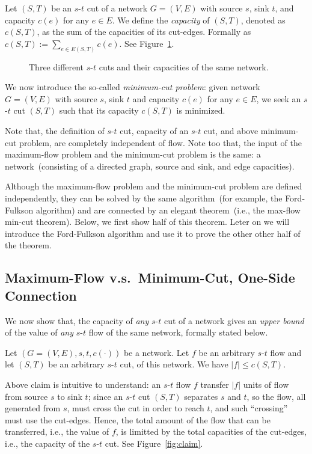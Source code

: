 Let $(S, T)$ be an $s$-$t$ cut of a network $G = (V, E)$ with source $s$, sink $t$, and capacity $c(e)$ for any $e\in E$.
We define the \emph{capacity} of $(S, T)$, denoted as $c(S, T)$, as the sum of the capacities of its cut-edges. Formally
as $c(S, T) := \sum_{e\in E(S, T)} c(e)$. See Figure~\ref{fig:cut}.

\begin{figure}[h]
\centering{}
\caption{Three different $s$-$t$ cuts and their capacities of the same network.}
\label{fig:cut}
\end{figure}

We now introduce the so-called \emph{minimum-cut problem}: given network $G = (V, E)$ with source $s$, sink $t$ and capacity $c(e)$ for any $e\in E$,
   we seek an $s$-$t$ cut $(S, T)$ such that its capacity $c(S, T)$ is minimized.

Note that, the definition of $s$-$t$ cut, capacity of an $s$-$t$ cut, and above minimum-cut problem,
are completely independent of flow. Note too that, the input of the maximum-flow problem and the minimum-cut
problem is the same: a network~(consisting of a directed graph, source and sink, and edge capacities).

Although the maximum-flow problem and the minimum-cut problem are defined independently, they
can be solved by the same algorithm~(for example, the Ford-Fulkson algorithm)
and are connected by an elegant theorem~(i.e., the max-flow min-cut theorem).
Below, we first show half of this theorem.
Leter on we will introduce the Ford-Fulkson algorithm
and use it to prove the other other half of the theorem.

\subsection*{Maximum-Flow v.s.\ Minimum-Cut, One-Side Connection}

We now show that, the capacity of \emph{any} $s$-$t$ cut of a network
gives an \emph{upper bound} of the value of \emph{any} $s$-$t$ flow of the same network, 
formally stated below.
\begin{claim} \label{claim1}
Let $(G=(V, E), s, t, c(\cdot))$ be a network.
Let $f$ be an arbitrary $s$-$t$ flow and let $(S, T)$ be an arbitrary $s$-$t$ cut, of this network.
We have $|f| \le c(S, T)$.
\end{claim}

Above claim is intuitive to understand: an $s$-$t$ flow $f$ transfer $|f|$ units of flow from source $s$ to sink $t$;
since an $s$-$t$ cut $(S, T)$ separates $s$ and $t$, so the flow, all generated from $s$, must cross the cut in order to reach $t$,
and such ``crossing'' must use the cut-edges.
Hence, the total amount of the flow that can be transferred, i.e., the value of $f$, is limitted by
the total capacities of the cut-edges, i.e., the capacity of the $s$-$t$ cut.
See Figure~\ref{fig:claim}.

